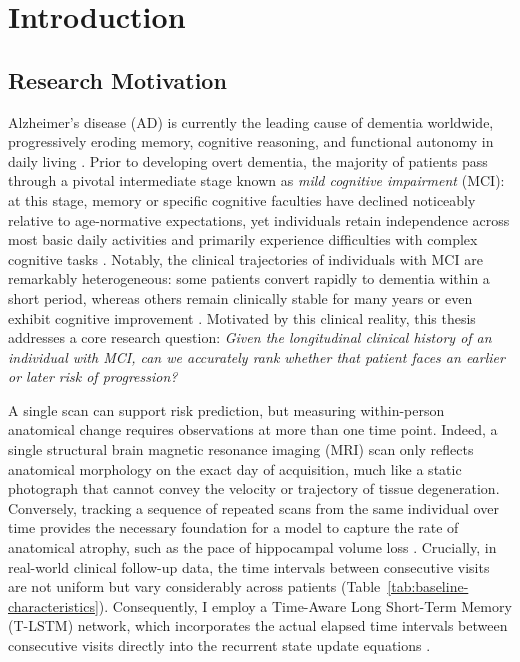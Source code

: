 \chapter{Introduction}
\label{chap:intro}

\section{Research Motivation}
Alzheimer's disease (AD) is currently the leading cause of dementia worldwide, progressively eroding memory, cognitive reasoning, and functional autonomy in daily living \cite{cdc2024alzheimers,who2026dementia}. Prior to developing overt dementia, the majority of patients pass through a pivotal intermediate stage known as \emph{mild cognitive impairment} (MCI): at this stage, memory or specific cognitive faculties have declined noticeably relative to age-normative expectations, yet individuals retain independence across most basic daily activities and primarily experience difficulties with complex cognitive tasks \cite{jack2018niaaa}. Notably, the clinical trajectories of individuals with MCI are remarkably heterogeneous: some patients convert rapidly to dementia within a short period, whereas others remain clinically stable for many years or even exhibit cognitive improvement \cite{petersen2018mci,salemme2025prognosis}. Motivated by this clinical reality, this thesis addresses a core research question: \emph{Given the longitudinal clinical history of an individual with MCI, can we accurately rank whether that patient faces an earlier or later risk of progression?}

A single scan can support risk prediction, but measuring within-person anatomical change requires observations at more than one time point. Indeed, a single structural brain magnetic resonance imaging (MRI) scan only reflects anatomical morphology on the exact day of acquisition, much like a static photograph that cannot convey the velocity or trajectory of tissue degeneration. Conversely, tracking a sequence of repeated scans from the same individual over time provides the necessary foundation for a model to capture the rate of anatomical atrophy, such as the pace of hippocampal volume loss \cite{dong2021deepatrophy}. Crucially, in real-world clinical follow-up data, the time intervals between consecutive visits are not uniform but vary considerably across patients (Table~\ref{tab:baseline-characteristics}). Consequently, I employ a Time-Aware Long Short-Term Memory (T-LSTM) network, which incorporates the actual elapsed time intervals between consecutive visits directly into the recurrent state update equations \cite{baytas2017patient}.

